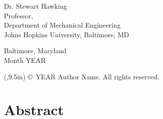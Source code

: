 Dr. Stewart Hawking \\
Professor, \\
Department of Mechanical Engineering \\
Johns Hopkins University, Baltimore, MD 



\vspace{0.5in}
\begin{center}
    Baltimore, Maryland \\          %
    Month YEAR                      %
    
    {\begin{textblock*}{\textwidth}(\GlobalMargin,9.5in)
        \copyright\ YEAR Author Name. All rights reserved.
    \end{textblock*}
    \null}
\end{center}






\clearpage 
{}
\setcounter{page}{2}
\MainTextSpacing
{}
\section*{Abstract}

\blindtext



